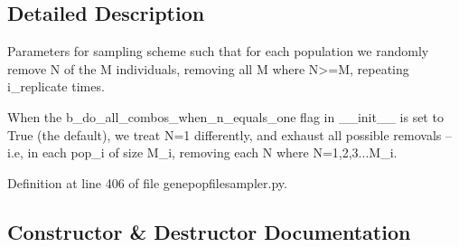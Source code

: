 \subsection{Detailed Description}
\begin{DoxyVerb}Parameters for sampling scheme such that for each population
we randomly remove N of the M individuals, removing all M where
N>=M, repeating i_replicate times. 

When the b_do_all_combos_when_n_equals_one flag in __init__ is
set to True (the default), we treat N=1 differently, and 
exhaust all possible removals -- i.e, in each pop_i 
of size M_i, removing each N where N=1,2,3...M_i.
\end{DoxyVerb}
 

Definition at line 406 of file genepopfilesampler.\+py.



\subsection{Constructor \& Destructor Documentation}
